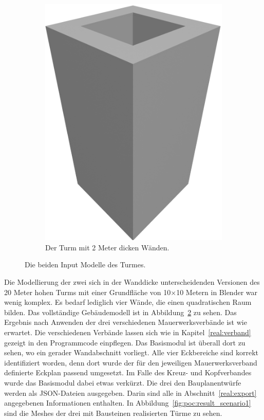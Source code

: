 \begin{figure}[hbt]
\begin{subfigure}[b]{0.25\columnwidth}
    \includegraphics[width=\columnwidth]{fig/scenario1_render_base_thick.png}
    \caption{Der Turm mit 2 Meter dicken Wänden.}\label{fig:poc:scenario1_wall_thick}
  \end{subfigure}
  \hspace*{\fill}%
  \caption{Die beiden Input Modelle des Turmes.}\label{fig:poc:scenario1 modell}
\end{figure}
Die Modellierung der zwei sich in der Wanddicke unterscheidenden Versionen des 20 Meter hohen Turms mit einer Grundfläche von 10$\times$10 Metern in Blender war wenig komplex.
Es bedarf lediglich vier Wände, die einen quadratischen Raum bilden.
Das vollständige Gebäudemodell ist in Abbildung~\ref{fig:poc:scenario1 modell} zu sehen.
Das Ergebnis nach Anwenden der drei verschiedenen Mauerwerksverbände ist wie erwartet.
Die verschiedenen Verbände lassen sich wie in Kapitel~\ref{real:verband} gezeigt in den Programmcode einpflegen.
Das Basismodul ist überall dort zu sehen, wo ein gerader Wandabschnitt vorliegt.
Alle vier Eckbereiche sind korrekt identifiziert worden, denn dort wurde der für den jeweiligen Mauerwerksverband definierte Eckplan passend umgesetzt.
Im Falle des Kreuz- und Kopfverbandes wurde das Basismodul dabei etwas verkürzt.
Die drei den Bauplanentwürfe werden als JSON-Dateien ausgegeben.
Darin sind alle in Abschnitt~\ref{real:export} angegebenen Informationen enthalten.
In Abbildung~\ref{fig:poc:result_scenario1} sind die Meshes der drei mit Bausteinen realisierten Türme zu sehen.

